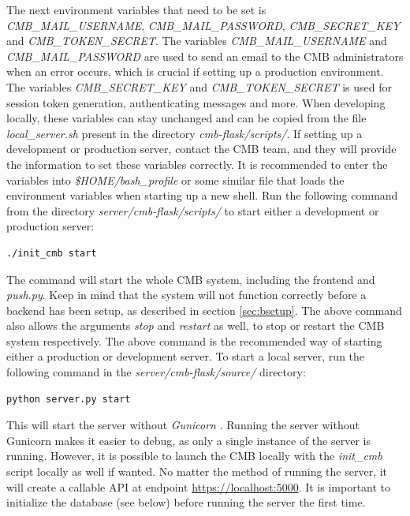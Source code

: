 The next environment variables that need to be set is \textit{CMB\_MAIL\_USERNAME}, \textit{CMB\_MAIL\_PASSWORD}, \textit{CMB\_SECRET\_KEY} and \textit{CMB\_TOKEN\_SECRET}. The variables \textit{CMB\_MAIL\_USERNAME} and \textit{CMB\_MAIL\_PASSWORD} are used to send an email to the CMB administrators when an error occurs, which is crucial if setting up a production environment. The variables \textit{CMB\_SECRET\_KEY} and \textit{CMB\_TOKEN\_SECRET} is used for session token generation, authenticating messages and more.  When developing locally, these variables can stay unchanged and can be copied from the file \textit{local\_server.sh} present in the directory \textit{cmb-flask/scripts/}. If setting up a development or production server, contact the CMB team, and they will provide the information to set these variables correctly. It is recommended to enter the variables into \textit{\$HOME/bash\_profile} or some similar file that loads the environment variables when starting up a new shell. Run the following command from the directory \textit{server/cmb-flask/scripts/} to start either a development or production server:
\begin{lstlisting}
./init_cmb start
\end{lstlisting}
The command will start the whole CMB system, including the frontend and \textit{push.py}. Keep in mind that the system will not function correctly before a backend has been setup, as described in section \ref{sec:bsetup}. The above command also allows the arguments \textit{stop} and \textit{restart} as well, to stop or restart the CMB system respectively. The above command is the recommended way of starting either a production or development server. To start a local server, run the following command in the \textit{server/cmb-flask/source/} directory:
\begin{lstlisting}
python server.py start
\end{lstlisting}
This will start the server without \textit{Gunicorn} \cite{m:guni}. Running the server without Gunicorn makes it easier to debug, as only a single instance of the server is running. However, it is possible to launch the CMB locally with the \textit{init\_cmb} script locally as well if wanted. No matter the method of running the server, it will create a callable API at endpoint \url{https://localhost:5000}. It is important to initialize the database (see below) before running the server the first time.

